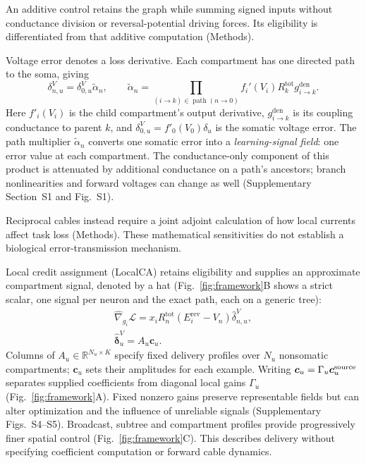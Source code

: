 \documentclass[11pt]{article}
\begin{document}
An additive control retains the graph while summing signed inputs without conductance division or reversal-potential driving forces. Its eligibility is differentiated from that additive computation (Methods).

Voltage error denotes a loss derivative. Each compartment has one directed path to the soma, giving
\begin{equation}
\delta^V_{n,u}=\delta^V_{0,u}\widetilde\alpha_n,
\qquad
\widetilde\alpha_n=
\prod_{(i\to k)\in\operatorname{path}(n\to0)}
f_i'(V_i)R_k^{\mathrm{tot}}g_{i\to k}^{\mathrm{den}}.
\label{eq:pathgain}
\end{equation}
Here \(f'_i(V_i)\) is the child compartment's output derivative, \(g_{i\to k}^{\mathrm{den}}\) is its coupling conductance to parent \(k\), and \(\delta^V_{0,u}=f'_0(V_0)\delta_u\) is the somatic voltage error. The path multiplier \(\widetilde\alpha_n\) converts one somatic error into a \emph{learning-signal field}: one error value at each compartment. The conductance-only component of this product is attenuated by additional conductance on a path's ancestors; branch nonlinearities and forward voltages can change as well (Supplementary Section~S1 and Fig.~S1).

Reciprocal cables instead require a joint adjoint calculation of how local currents affect task loss (Methods). These mathematical sensitivities do not establish a biological error-transmission mechanism.

Local credit assignment (LocalCA) retains eligibility and supplies an approximate compartment signal, denoted by a hat (Fig.~\ref{fig:framework}B shows a strict scalar, one signal per neuron and the exact path, each on a generic tree):
\begin{align}
\widehat\nabla_{g_i}\mathcal L
=x_iR_n^{\mathrm{tot}}(E_i^{\mathrm{rev}}-V_n)\widehat\delta^V_{n,u},
\label{eq:dendriticlocalrule}
\\
\widehat{\bm\delta}^{V}_u=A_u\bm c_u.
\label{eq:routedfield}
\end{align}
Columns of \(A_u\in\mathbb R^{N_u\times K}\) specify fixed delivery profiles over \(N_u\) nonsomatic compartments; \(\bm c_u\) sets their amplitudes for each example. Writing \(\bm c_u=\Gamma_u\bm c_u^{\rm source}\) separates supplied coefficients from diagonal local gains \(\Gamma_u\) (Fig.~\ref{fig:framework}A). Fixed nonzero gains preserve representable fields but can alter optimization and the influence of unreliable signals (Supplementary Figs.~S4--S5). Broadcast, subtree and compartment profiles provide progressively finer spatial control (Fig.~\ref{fig:framework}C). This describes delivery without specifying coefficient computation or forward cable dynamics.
\end{document}
